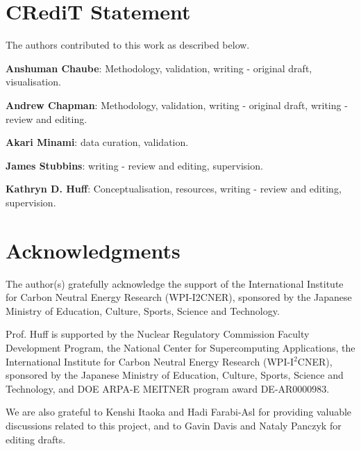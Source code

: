 \section{CRediT Statement}

The authors contributed to this work as described below.

\textbf{Anshuman Chaube}: Methodology, validation, writing - original draft, visualisation.

\textbf{Andrew Chapman}: Methodology, validation,  writing - original draft, writing - review and editing.

\textbf{Akari Minami}: data curation, validation.

\textbf{James Stubbins}: writing - review and editing, supervision. 

\textbf{Kathryn D. Huff}: Conceptualisation, resources, writing - review and editing, supervision.

\section{Acknowledgments}

The author(s) gratefully acknowledge the support of the International Institute for Carbon Neutral Energy Research (WPI-I2CNER), sponsored by the Japanese Ministry of Education, Culture, Sports, Science and Technology. 

Prof. Huff is supported by the Nuclear Regulatory Commission Faculty Development Program, the National Center for Supercomputing Applications, the International Institute for Carbon Neutral Energy Research (WPI-I$^2$CNER), sponsored by the Japanese Ministry of Education, Culture, Sports, Science and Technology, and  DOE ARPA-E MEITNER program award DE-AR0000983.

We are also grateful to Kenshi Itaoka and Hadi Farabi-Asl for providing valuable discussions related to this project, and to Gavin Davis and Nataly Panczyk for editing drafts.